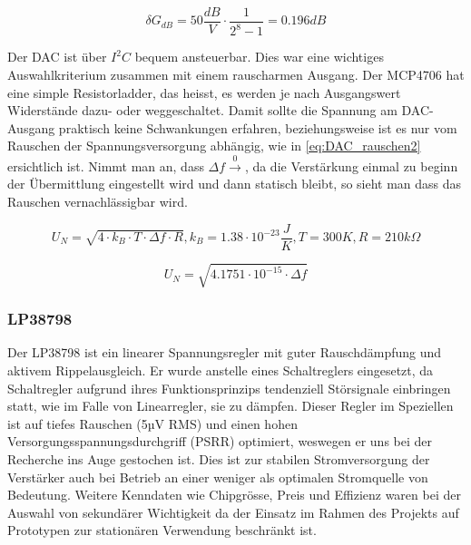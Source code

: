 \begin{equation}
    \delta G_{dB} = 50 \frac{dB}{V} \cdot \frac{1}{2^8 - 1} = 0.196 dB
\label{eq:DAC_wert}
\end{equation}

Der DAC ist über $I^2 C$ bequem ansteuerbar. Dies war eine wichtiges Auswahlkriterium zusammen mit einem rauscharmen Ausgang. Der MCP4706 hat eine simple Resistorladder, das heisst, es werden je nach Ausgangswert Widerstände dazu- oder weggeschaltet. Damit sollte die Spannung am DAC-Ausgang praktisch keine Schwankungen erfahren, beziehungsweise ist es nur vom Rauschen der Spannungsversorgung abhängig, wie in \ref{eq:DAC_rauschen2} ersichtlich ist. Nimmt man an, dass $\Delta f \xrightarrow 0$, da die Verstärkung einmal zu beginn der Übermittlung eingestellt wird und dann statisch bleibt, so sieht man dass das Rauschen vernachlässigbar wird.

\begin{equation}
    U_N = \sqrt{4 \cdot k_B \cdot T \cdot \Delta f \cdot R}, k_B = 1.38\cdot 10^{-23}\frac{J}{K}, T = 300K, R = 210k\Omega
\label{eq:DAC_rauschen}
\end{equation}

\begin{equation}
    U_N = \sqrt{4.1751\cdot 10^{-15} \cdot \Delta f}
\label{eq:DAC_rauschen2}
\end{equation}

\subsubsection{LP38798}
Der LP38798 ist ein linearer Spannungsregler mit guter Rauschdämpfung und aktivem Rippelausgleich. Er wurde anstelle eines Schaltreglers eingesetzt, da Schaltregler aufgrund ihres Funktionsprinzips tendenziell Störsignale einbringen statt, wie im Falle von Linearregler, sie zu dämpfen.
Dieser Regler im Speziellen ist auf tiefes Rauschen (5µV RMS) und einen hohen Versorgungsspannungsdurchgriff (PSRR) optimiert, weswegen er uns bei der Recherche ins Auge gestochen ist. Dies ist zur stabilen Stromversorgung der Verstärker auch bei Betrieb an einer weniger als optimalen Stromquelle von Bedeutung.
Weitere Kenndaten wie Chipgrösse, Preis und Effizienz waren bei der Auswahl von sekundärer Wichtigkeit da der Einsatz im Rahmen des Projekts auf Prototypen zur stationären Verwendung beschränkt ist.

